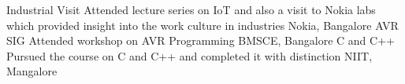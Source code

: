 \begin{cvhonors}
     \cvhonor
    {Industrial Visit}
    {Attended lecture series on IoT and also a visit to Nokia labs which provided insight into the work culture in industries}
    {Nokia, Bangalore}
    {}
    \cvhonor
    {AVR SIG}
    {Attended workshop on AVR Programming}
    {BMSCE, Bangalore}
    {}
    \cvhonor
    {C and C++}
    {Pursued the course on C and C++ and completed it with distinction}
    {NIIT, Mangalore}
    {}
\end{cvhonors}
